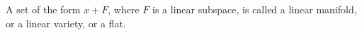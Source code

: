 A set of the form $x + F$, where $F$ is a linear subspace, is called a linear manifold, or a linear variety, or a flat.
